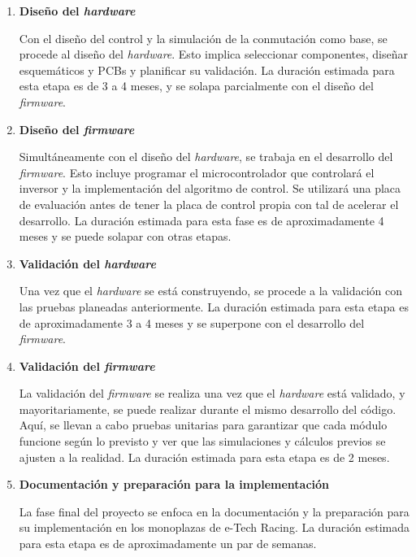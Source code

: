 \begin{enumerate}
\item \textbf{Diseño del \textit{hardware}}

Con el diseño del control y la simulación de la conmutación como base, se procede al diseño del \textit{hardware}. Esto implica seleccionar componentes, diseñar esquemáticos y PCBs y planificar su validación. La duración estimada para esta etapa es de 3 a 4 meses, y se solapa parcialmente con el diseño del \textit{firmware}.
\newpage
\item \textbf{Diseño del \textit{firmware}}

Simultáneamente con el diseño del \textit{hardware}, se trabaja en el desarrollo del \textit{firmware}. Esto incluye programar el microcontrolador que controlará el inversor y la implementación del algoritmo de control. Se utilizará una placa de evaluación antes de tener la placa de control propia con tal de acelerar el desarrollo. La duración estimada para esta fase es de aproximadamente 4 meses y se puede solapar con otras etapas.

\item \textbf{Validación del \textit{hardware}}

Una vez que el \textit{hardware} se está construyendo, se procede a la validación con las pruebas planeadas anteriormente. La duración estimada para esta etapa es de aproximadamente 3 a 4 meses y se superpone con el desarrollo del \textit{firmware}.

\item \textbf{Validación del \textit{firmware}}

La validación del \textit{firmware} se realiza una vez que el \textit{hardware} está validado, y mayoritariamente, se puede realizar durante el mismo desarrollo del código. Aquí, se llevan a cabo pruebas unitarias para garantizar que cada módulo funcione según lo previsto y ver que las simulaciones y cálculos previos se ajusten a la realidad. La duración estimada para esta etapa es de 2 meses.

\item \textbf{Documentación y preparación para la implementación}

La fase final del proyecto se enfoca en la documentación y la preparación para su implementación en los monoplazas de e-Tech Racing. La duración estimada para esta etapa es de aproximadamente un par de semanas. 

\end{enumerate}

\newpage

